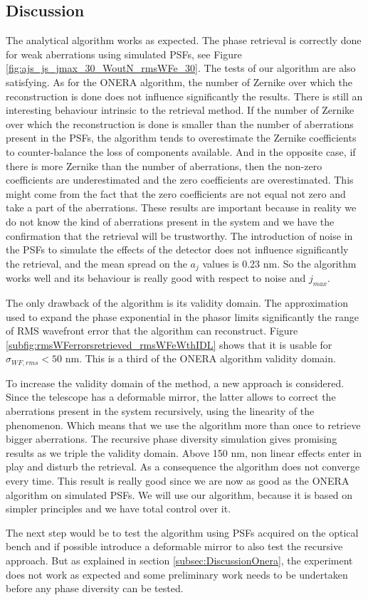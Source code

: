 \subsection{Discussion}
\label{subsec:DiscussionOurPD}

The analytical algorithm works as expected. The phase retrieval is correctly done for weak aberrations using simulated PSFs, see Figure \ref{fig:ajs_js_jmax_30_WoutN_rmsWFe_30}. The tests of our algorithm are also satisfying. As for the ONERA algorithm, the number of Zernike over which the reconstruction is done does not influence significantly the results. There is still an interesting behaviour intrinsic to the retrieval method. If the number of Zernike over which the reconstruction is done is smaller than the number of aberrations present in the PSFs, the algorithm tends to overestimate the Zernike coefficients to counter-balance the loss of components available. And in the opposite case, if there is more Zernike than the number of aberrations, then the non-zero coefficients are underestimated and the zero coefficients are overestimated. This might come from the fact that the zero coefficients are not equal not zero and take a part of the aberrations. These results are important because in reality we do not know the kind of aberrations present in the system and we have the confirmation that the retrieval will be trustworthy. The introduction of noise in the PSFs to simulate the effects of the detector does not influence significantly the retrieval, and the mean spread on the $a_j$ values is 0.23 nm. So the algorithm works well and its behaviour is really good with respect to noise and $j_{max}$.

The only drawback of the algorithm is its validity domain. The approximation used to expand the phase exponential in the phasor limits significantly the range of RMS wavefront error that the algorithm can reconstruct. Figure \ref{subfig:rmsWFerrorsretrieved_rmsWFeWthIDL} shows that it is usable for $\sigma_{WF,rms} < 50$ nm. This is a third of the ONERA algorithm validity domain.

To increase the validity domain of the method, a new approach is considered. Since the telescope has a deformable mirror, the latter allows to correct the aberrations present in the system recursively, using the linearity of the phenomenon. Which means that we use the algorithm more than once to retrieve bigger aberrations. The recursive phase diversity simulation gives promising results as we triple the validity domain. Above 150 nm, non linear effects enter in play and disturb the retrieval. As a consequence the algorithm does not converge every time. This result is really good since we are now as good as the ONERA algorithm on simulated PSFs. We will use our algorithm, because it is based on simpler principles and we have total control over it. 

The next step would be to test the algorithm using PSFs acquired on the optical bench and if possible introduce a deformable mirror to also test the recursive approach. But as explained in section \ref{subsec:DiscussionOnera}, the experiment does not work as expected and some preliminary work needs to be undertaken before any phase diversity can be tested.
